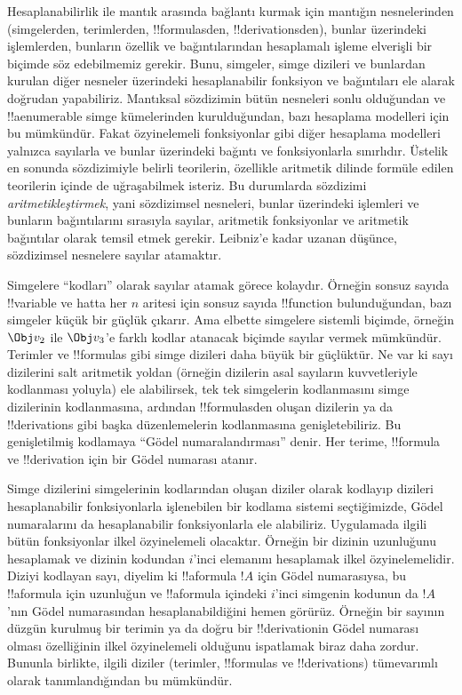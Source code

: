 \documentclass[../../../include/open-logic-section]{subfiles}
\begin{document}

Hesaplanabilirlik ile mantık arasında bağlantı kurmak için mantığın
nesnelerinden (simgelerden, terimlerden, !!{formula}s{}den,
!!{derivation}s{}den), bunlar üzerindeki işlemlerden, bunların özellik ve
bağıntılarından hesaplamalı işleme elverişli bir biçimde söz edebilmemiz
gerekir. Bunu, simgeler, simge dizileri ve bunlardan kurulan diğer nesneler
üzerindeki hesaplanabilir fonksiyon ve bağıntıları ele alarak doğrudan
yapabiliriz. Mantıksal sözdizimin bütün nesneleri sonlu olduğundan ve
!!a{enumerable} simge kümelerinden kurulduğundan, bazı hesaplama modelleri
için bu mümkündür. Fakat özyinelemeli fonksiyonlar gibi diğer hesaplama
modelleri yalnızca sayılarla ve bunlar üzerindeki bağıntı ve fonksiyonlarla
sınırlıdır. Üstelik en sonunda sözdizimiyle belirli teorilerin, özellikle
aritmetik dilinde formüle edilen teorilerin içinde de uğraşabilmek isteriz.
Bu durumlarda sözdizimi \emph{aritmetikleştirmek}, yani sözdizimsel nesneleri,
bunlar üzerindeki işlemleri ve bunların bağıntılarını sırasıyla sayılar,
aritmetik fonksiyonlar ve aritmetik bağıntılar olarak temsil etmek gerekir.
Leibniz'e kadar uzanan düşünce, sözdizimsel nesnelere sayılar atamaktır.

Simgelere ``kodları'' olarak sayılar atamak görece kolaydır. Örneğin sonsuz
sayıda !!{variable} ve hatta her $n$ aritesi için sonsuz sayıda
!!{function} bulunduğundan, bazı simgeler küçük bir güçlük çıkarır. Ama
elbette simgelere sistemli biçimde, örneğin $\Obj v_2$ ile $\Obj v_3$'e
farklı kodlar atanacak biçimde sayılar vermek mümkündür. Terimler ve
!!{formula}s gibi simge dizileri daha büyük bir güçlüktür. Ne var ki sayı
dizilerini salt aritmetik yoldan (örneğin dizilerin asal sayıların kuvvetleriyle
kodlanması yoluyla) ele alabilirsek, tek tek simgelerin kodlanmasını simge
dizilerinin kodlanmasına, ardından !!{formula}s{}den oluşan dizilerin ya da
!!{derivation}s gibi başka düzenlemelerin kodlanmasına genişletebiliriz.
Bu genişletilmiş kodlamaya ``Gödel numaralandırması'' denir. Her terime,
!!{formula} ve !!{derivation} için bir Gödel numarası atanır.

Simge dizilerini simgelerinin kodlarından oluşan diziler olarak kodlayıp
dizileri hesaplanabilir fonksiyonlarla işlenebilen bir kodlama sistemi
seçtiğimizde, Gödel numaralarını da hesaplanabilir fonksiyonlarla ele
alabiliriz. Uygulamada ilgili bütün fonksiyonlar ilkel özyinelemeli olacaktır.
Örneğin bir dizinin uzunluğunu hesaplamak ve dizinin kodundan $i$'inci
elemanını hesaplamak ilkel özyinelemelidir. Diziyi kodlayan sayı, diyelim ki
!!a{formula} $!A$ için Gödel numarasıysa, bu !!a{formula} için uzunluğun ve
!!a{formula} içindeki $i$'inci simgenin kodunun da $!A$'nın Gödel numarasından
hesaplanabildiğini hemen görürüz. Örneğin bir sayının düzgün kurulmuş bir
terimin ya da doğru bir !!{derivation}{}in Gödel numarası olması özelliğinin
ilkel özyinelemeli olduğunu ispatlamak biraz daha zordur. Bununla birlikte,
ilgili diziler (terimler, !!{formula}s ve !!{derivation}s) tümevarımlı olarak
tanımlandığından bu mümkündür.
\end{document}
